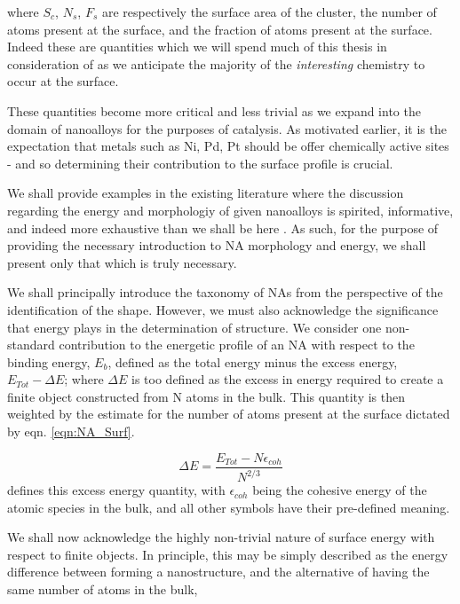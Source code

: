 where $S_c$, $N_s$, $F_s$ are respectively the surface area of the cluster, the number of atoms present at the surface, and the fraction of atoms present at the surface. Indeed these are quantities which we will spend much of this thesis in consideration of as we anticipate the majority of the \textit{interesting} chemistry to occur at the surface. 

These quantities become more critical and less trivial as we expand into the domain of nanoalloys for the purposes of catalysis. As motivated earlier, it is the expectation that metals such as Ni, Pd, Pt should be offer chemically active sites - and so determining their contribution to the surface profile is crucial.

We shall provide examples in the existing literature where the discussion regarding the energy and morphologiy of given nanoalloys is spirited, informative, and indeed more exhaustive than we shall be here \cite{PeptidetemplatedAuPtnanoparticlesefficientfunctionalelectrocatalysts,AgAuNanoparticles,AgPdAuPdAuPt,doi:10.1021/cr040090g}. As such, for the purpose of providing the necessary introduction to NA morphology and energy, we shall present only that which is truly necessary. 

We shall principally introduce the taxonomy of NAs from the perspective of the identification of the shape. However, we must also acknowledge the significance that energy plays in the determination of structure. We consider one non-standard contribution to the energetic profile of an NA with respect to the binding energy, $E_{b}$, defined as the total energy minus the excess energy, $E_{Tot} - \Delta E$; where $\Delta E$ is too defined as the excess in energy required to create a finite object constructed from N atoms in the bulk. This quantity is then weighted by the estimate for the number of atoms present at the surface dictated by eqn. \ref{eqn:NA_Surf}.

\begin{equation}
    \Delta E = \frac{E_{Tot} - N\epsilon_{coh}}{N^{2/3}}
    \label{eqn:excessE}
\end{equation}
defines this excess energy quantity, with $\epsilon_{coh}$ being the cohesive energy of the atomic species in the bulk, and all other symbols have their pre-defined meaning.

We shall now acknowledge the highly non-trivial nature of surface energy with respect to finite objects. In principle, this may be simply described as the energy difference between forming a nanostructure, and the alternative of having the same number of atoms in the bulk,

